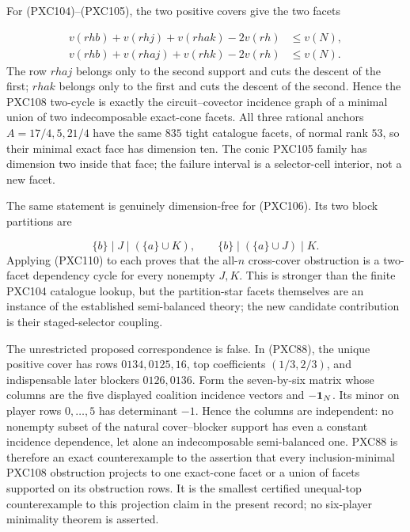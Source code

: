 \documentclass[11pt]{article}
\begin{document}
For (PXC104)--(PXC105), the two positive covers give the two facets

\begin{equation}
\begin{split}
 v(rhb)+v(rhj)+v(rhak)-2v(rh)&\le v(N),\\
 v(rhb)+v(rhaj)+v(rhk)-2v(rh)&\le v(N).
\end{split}
\tag{PXC111b}
\end{equation}
The row \(rhaj\) belongs only to the second support and cuts the descent of
the first; \(rhak\) belongs only to the first and cuts the descent of the
second.  Hence the PXC108 two-cycle is exactly the circuit--covector incidence
graph of a minimal union of two indecomposable exact-cone facets.  All three
rational anchors \(A=17/4,5,21/4\) have the same \(835\) tight catalogue
facets, of normal rank \(53\), so their minimal exact face has dimension ten.
The conic PXC105 family has dimension two inside that face; the failure
interval is a selector-cell interior, not a new facet.

The same statement is genuinely dimension-free for (PXC106).  Its two block
partitions are

\[
 \{b\}\mid J\mid(\{a\}\cup K),\qquad
 \{b\}\mid(\{a\}\cup J)\mid K.
\]
Applying (PXC110) to each proves that the all-\(n\) cross-cover obstruction
is a two-facet dependency cycle for every nonempty \(J,K\).  This is stronger
than the finite PXC104 catalogue lookup, but the partition-star facets
themselves are an instance of the established semi-balanced theory; the new
candidate contribution is their staged-selector coupling.

The unrestricted proposed correspondence is false.  In (PXC88), the unique
positive cover has rows \(0134,0125,16\), top coefficients
\((1/3,2/3)\), and indispensable later blockers \(0126,0136\).  Form the
seven-by-six matrix whose columns are the five displayed coalition incidence
vectors and \(-{\bf1}_N\).  Its minor on player rows \(0,\ldots,5\) has
determinant \(-1\).  Hence the columns are independent: no nonempty subset of
the natural cover--blocker support has even a constant incidence dependence,
let alone an indecomposable semi-balanced one.  PXC88 is therefore an exact
counterexample to the assertion that every inclusion-minimal PXC108
obstruction projects to one exact-cone facet or a union of facets supported
on its obstruction rows.  It is the smallest certified unequal-top
counterexample to this projection claim in the present record; no
six-player minimality theorem is asserted.
\end{document}
